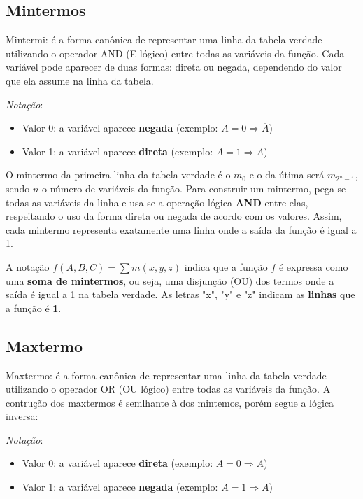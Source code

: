 \documentclass[12pt]{article}
\begin{document}
\subsection{Mintermos}
Mintermi: é a forma canônica de representar uma linha da tabela verdade utilizando o operador AND (E lógico) entre todas as variáveis da função.
Cada variável pode aparecer de duas formas: direta ou negada, dependendo do valor que ela assume na linha da tabela.

\textit{Notação}: 
\begin{itemize}
   \item Valor 0: a variável aparece \textbf{negada} (exemplo: $A = 0 \Rightarrow \overline{A}$)
   \item Valor 1: a variável aparece \textbf{direta} (exemplo: $A = 1 \Rightarrow A$)
\end{itemize}

O mintermo da primeira linha da tabela verdade é o $m_0$ e o da útima será $m_{2^n - 1}$, sendo $n$ o número de variáveis da função.
Para construir um mintermo, pega-se todas as variáveis da linha e usa-se a operação lógica \textbf{AND} entre elas, respeitando o uso da forma direta ou negada de acordo com os valores. Assim, cada mintermo representa exatamente uma linha onde a saída da função é igual a 1.

\begin{tcolorbox}[mynote, title=Notação – Forma Canônica por Mintermos]
A notação \textit{$f(A, B, C) = \sum m(x, y, z)$} indica que a função $f$ é expressa como uma \textbf{soma de mintermos}, ou seja, uma disjunção (OU) dos termos onde a saída é igual a 1 na tabela verdade. As letras "x", "y" e "z" indicam as \textbf{linhas} que a função é \textbf{1}. 
\end{tcolorbox} 

\vspace{0.5cm}

\subsection{Maxtermo}
Maxtermo: é a forma canônica de representar uma linha da tabela verdade utilizando o operador OR (OU lógico) entre todas as variáveis da função. 
A contrução dos maxtermos é semlhante à dos mintemos, porém segue a lógica inversa:

\textit{Notação}:
\begin{itemize}
   \item Valor 0: a variável aparece \textbf{direta} (exemplo: $A = 0 \Rightarrow A$)
   \item Valor 1: a variável aparece \textbf{negada} (exemplo: $A = 1 \Rightarrow \overline{A}$)
\end{itemize}
\end{document}
